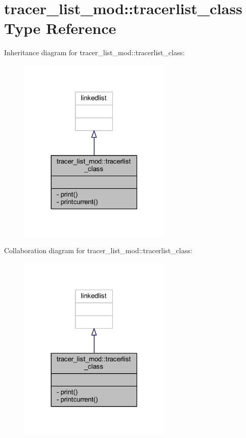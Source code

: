 \hypertarget{structtracer__list__mod_1_1tracerlist__class}{}\section{tracer\+\_\+list\+\_\+mod\+:\+:tracerlist\+\_\+class Type Reference}
\label{structtracer__list__mod_1_1tracerlist__class}


Inheritance diagram for tracer\+\_\+list\+\_\+mod\+:\+:tracerlist\+\_\+class\+:\nopagebreak
\begin{figure}[H]
\begin{center}
\leavevmode
\includegraphics[width=207pt]{structtracer__list__mod_1_1tracerlist__class__inherit__graph}
\end{center}
\end{figure}


Collaboration diagram for tracer\+\_\+list\+\_\+mod\+:\+:tracerlist\+\_\+class\+:\nopagebreak
\begin{figure}[H]
\begin{center}
\leavevmode
\includegraphics[width=207pt]{structtracer__list__mod_1_1tracerlist__class__coll__graph}
\end{center}
\end{figure}
